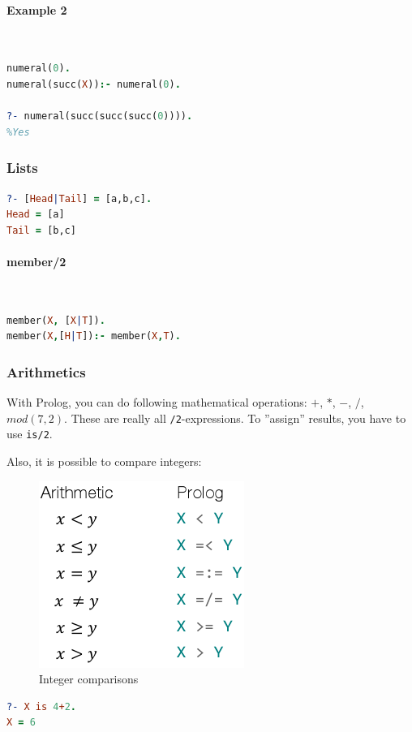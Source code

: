 \paragraph{Example 2} \hfill \\

\begin{lstlisting}[language=Prolog]
numeral(0).
numeral(succ(X)):- numeral(0).

?- numeral(succ(succ(succ(0)))).
%Yes
\end{lstlisting}

\subsubsection{Lists}

\begin{lstlisting}[language=Prolog]
?- [Head|Tail] = [a,b,c].
Head = [a]
Tail = [b,c]
\end{lstlisting}


\paragraph{member/2} \hfill \\

\begin{lstlisting}[language=Prolog]
member(X, [X|T]).
member(X,[H|T]):- member(X,T).
\end{lstlisting}

\subsubsection{Arithmetics}

With Prolog, you can do following mathematical operations: $+$, $*$, $-$, $/$, $mod(7,2)$. These are really all \lstinline|/2|-expressions. To ''assign'' results, you have to use \lstinline|is/2|.

Also, it is possible to compare integers:
\begin{figure}[h]
\centering
\includegraphics[width=0.2\linewidth]{images/integer_comparison}
\caption{Integer comparisons}
\label{fig:integercomparison}
\end{figure}


\begin{lstlisting}[language=Prolog]
?- X is 4+2.
X = 6
\end{lstlisting}

